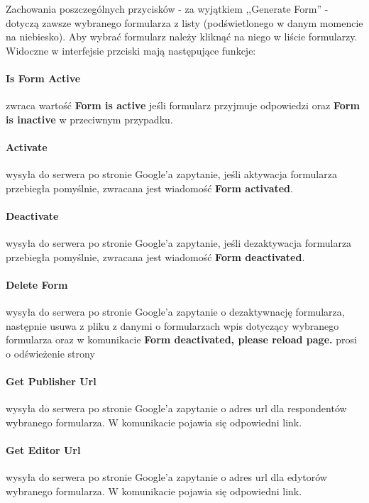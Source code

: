 \ind Zachowania poszczególnych przycisków  - za wyjątkiem ,,Generate Form'' - dotyczą zawsze wybranego formularza z listy (podświetlonego w danym momencie na niebiesko). Aby wybrać formularz należy kliknąć na niego w liście formularzy. 
\ind Widoczne w interfejsie przciski mają następujące funkcje:
\paragraph{Is Form Active} zwraca wartość \textbf{Form is active} jeśli formularz przyjmuje odpowiedzi oraz \textbf{Form is inactive} w przeciwnym przypadku.
\paragraph{Activate} wysyła do serwera po stronie Google'a zapytanie, jeśli aktywacja formularza przebiegła pomyślnie, zwracana jest wiadomość \textbf{Form activated}.
\paragraph{Deactivate} wysyła do serwera po stronie Google'a zapytanie, jeśli dezaktywacja formularza przebiegła pomyślnie, zwracana jest wiadomość \textbf{Form deactivated}.
\paragraph{Delete Form} wysyła do serwera po stronie Google'a zapytanie o dezaktywnację formularza, następnie usuwa z pliku z danymi o formularzach wpis dotyczący wybranego formularza oraz w komunikacie \textbf{Form deactivated, please reload page.} prosi o odświeżenie strony
\paragraph{Get Publisher Url} wysyła do serwera po stronie Google'a zapytanie o adres url dla respondentów wybranego formularza. W komunikacie pojawia się odpowiedni link.
\paragraph{Get Editor Url} wysyła do serwera po stronie Google'a zapytanie o adres url dla edytorów wybranego formularza. W komunikacie pojawia się odpowiedni link.


